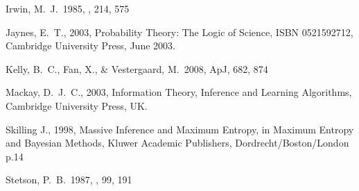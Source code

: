 \documentclass[manuscript]{aastex}
\begin{document}
\begin{thebibliography}{99}
 Irwin, M.~J.\ 1985, \mnras, 214, 
575 

 Jaynes, E.~T., 2003, Probability Theory: The
Logic of Science, ISBN 0521592712, Cambridge University Press, June 2003.

 Kelly, B.~C., Fan, X., 
\& Vestergaard, M.\ 2008, ApJ, 682, 874 

 Mackay, D.~J.~C., 2003, Information Theory,
Inference and Learning Algorithms, Cambridge University Press, UK.

Skilling J., 1998, Massive Inference and Maximum Entropy, in Maximum Entropy 
and Bayesian Methods, Kluwer Academic Publishers, Dordrecht/Boston/London p.14

 Stetson, P.~B.\ 1987, \pasp, 
99, 191 
\end{thebibliography}
\end{document}
